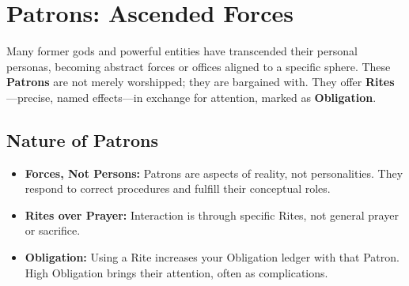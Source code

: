 \section{Patrons: Ascended Forces}

Many former gods and powerful entities have transcended their personal personas, becoming abstract forces or offices aligned to a specific sphere. These \textbf{Patrons} are not merely worshipped; they are bargained with. They offer \textbf{Rites}—precise, named effects—in exchange for attention, marked as \textbf{Obligation}.

\subsection*{Nature of Patrons}
\begin{itemize}
    \item \textbf{Forces, Not Persons:} Patrons are aspects of reality, not personalities. They respond to correct procedures and fulfill their conceptual roles.
    \item \textbf{Rites over Prayer:} Interaction is through specific Rites, not general prayer or sacrifice.
    \item \textbf{Obligation:} Using a Rite increases your Obligation ledger with that Patron. High Obligation brings their attention, often as complications.
\end{itemize}

